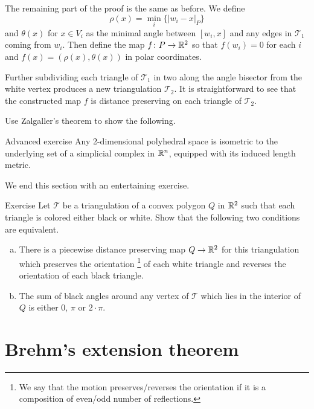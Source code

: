 The remaining part of the proof is the same  as before.
We define $$\rho(x)=\min_i\{|w_i-x|_P\}$$
and $\theta(x)$ for $x\in V_i$ as the minimal angle between $[w_i,x]$ and any edges
in $\mathcal{T}_1$ coming from $w_i$.
Then define the map $f\colon P\to \mathbb{R}^2$ so that 
$f(w_i)=0$ for each $i$ 
and
$f(x)=(\rho(x),\theta(x))$ in polar coordinates.

Further subdividing each triangle of $\mathcal{T}_1$
in two along the angle bisector from the white vertex produces a new triangulation $\mathcal{T}_2$.
It is straightforward to see that the constructed map $f$ is distance preserving on each triangle of $\mathcal{T}_2$.
\qeds

Use Zalgaller's theorem to show the following.

\begin{thm}{Advanced exercise}\label{ex:zalgalle+embedding}
Any 2-dimensional polyhedral space is isometric to the underlying set of a simplicial complex in $\mathbb{R}^n$, equipped with its induced length metric. 
\end{thm}


We end this section with an entertaining exercise.

\begin{thm}{Exercise}\label{ex:black-and-white}
Let $\mathcal{T}$ be a triangulation of a convex polygon $Q$ in $\mathbb{R}^2$ such that each triangle is colored either black or white.
Show that the following two conditions are equivalent.
\begin{enumerate}[a)]
\item There is a piecewise distance preserving map
$Q\to\mathbb{R}^2$ for this triangulation which preserves the orientation%
\footnote{We say that the motion preserves/reverses the orientation 
if it is a composition of even/odd number of reflections.} 
of each white triangle
and reverses the orientation of each black triangle.

\item The sum of black angles around any vertex  of $\mathcal{T}$ 
which lies in the interior of $Q$
is either $0$, $\pi$ or $2\cdot\pi$.
\end{enumerate}

\end{thm}

\chapter{Brehm's extension theorem}



